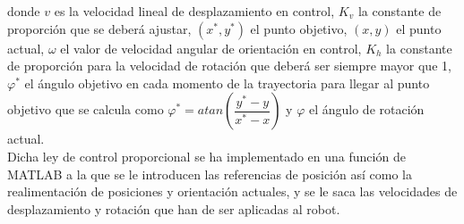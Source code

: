 \documentclass[a4paper,twoside]{article}
\begin{document}
	donde $v$ es la velocidad lineal de desplazamiento en control, $K_v$ la constante de proporción que se deberá ajustar, $(x^*,y^*)$ el punto objetivo, $(x,y)$ el punto actual, $\omega$ el valor de velocidad angular de orientación en control, $K_h$ la constante de proporción para la velocidad de rotación que deberá ser siempre mayor que 1, $\varphi^*$ el ángulo objetivo en cada momento de la trayectoria para llegar al punto objetivo que se calcula como $\varphi^*=atan(\dfrac{y^*-y}{x^*-x})$ y $\varphi$ el ángulo de rotación actual.\\
	
	Dicha ley de control proporcional se ha implementado en una función de MATLAB a la que se le introducen las referencias de posición así como la realimentación de posiciones y orientación actuales, y se le saca las velocidades de desplazamiento y rotación que han de ser aplicadas al robot.\\
	
\end{document}
